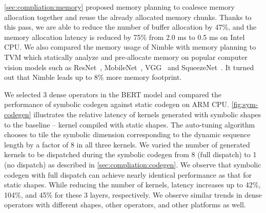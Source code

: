
\autoref{sec:compliation:memory} proposed memory planning to coalesce memory allocation together and reuse the already allocated memory chunks. Thanks to this pass, we are able to reduce the number of buffer allocation by 47\%, and the memory allocation latency is reduced by 75\% from 2.0 ms to 0.5 ms on Intel CPU. We also compared the memory usage of Nimble with memory planning to TVM which statically analyze and pre-allocate memory on popular computer vision models such as ResNet~\citep{he2016deep}, MobileNet~\citep{howard2017mobilenets}, VGG~\citep{simonyan2014very} and SqueezeNet~\citep{iandola2016squeezenet}. It turned out that Nimble leads up to 8\% more memory footprint.

 We selected 3 dense operators in the BERT model and compared the performance of symbolic codegen against static codegen on ARM CPU.
\autoref{fig:sym-codegen} illustrates the relative latency of kernels generated with symbolic shapes to the baseline -- kernel compiled with static shapes. The auto-tuning algorithm chooses to tile the symbolic dimension corresponding to the dynamic sequence length by a factor of 8 in all three kernels. We varied the number of generated kernels to be dispatched during the symbolic codegen from 8 (full dispatch) to 1 (no dispatch) as described in \autoref{sec:compliation:codegen}. We observe that symbolic codegen with full dispatch can achieve nearly identical performance as that for static shapes. While reducing the number of kernels, latency increases up to 42\%, 104\%, and 45\% for these 3 layers, respectively.
We observe similar trends in dense operators with different shapes, other operators, and other platforms as well.



